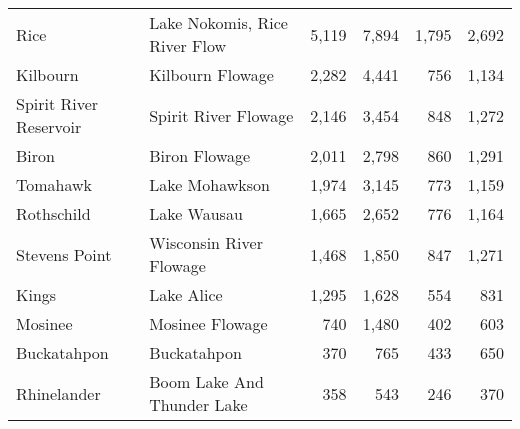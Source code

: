 \begin{table}[h!]
\begin{table}[h]
\begin{tabular}{llrrrr}
			Rice                       & Lake Nokomis, Rice River Flow & 5,119                                & 7,894                                & 1,795                      & 2,692                      \\
			Kilbourn                   & Kilbourn Flowage              & 2,282                                & 4,441                                & 756                        & 1,134                      \\
			Spirit River Reservoir     & Spirit River Flowage          & 2,146                                & 3,454                                & 848                        & 1,272                      \\
			Biron                      & Biron Flowage                 & 2,011                                & 2,798                                & 860                        & 1,291                      \\
			Tomahawk                   & Lake Mohawkson                & 1,974                                & 3,145                                & 773                        & 1,159                      \\
			Rothschild                 & Lake Wausau                   & 1,665                                & 2,652                                & 776                        & 1,164                      \\
			Stevens Point              & Wisconsin River Flowage       & 1,468                                & 1,850                                & 847                        & 1,271                      \\
			Kings                      & Lake Alice                    & 1,295                                & 1,628                                & 554                        & 831                        \\
			Mosinee                    & Mosinee Flowage               & 740                                  & 1,480                                & 402                        & 603                        \\
			Buckatahpon                & Buckatahpon                   & 370                                  & 765                                  & 433                        & 650                        \\
			Rhinelander                & Boom Lake And Thunder Lake    & 358                                  & 543                                  & 246                        & 370                        \\

\end{tabular}
\end{table}
\end{table}
